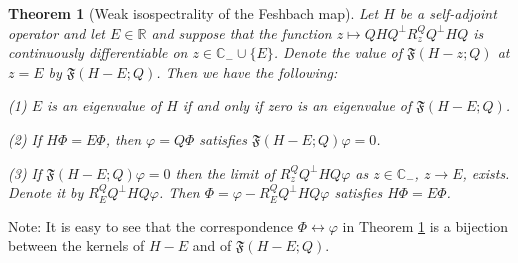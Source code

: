 \documentclass[letterpaper,onecolumn,11pt,accepted=2021-12-09]{quantumarticle}
\numberwithin{equation}{section}
\newcounter{resultcounter}[section]
\newtheorem{thm}[resultcounter]{Theorem}
\begin{document}
\begin{thm}[Weak isospectrality of the Feshbach map]
	\label{weakFeshthm}
Let $H$ be a self-adjoint operator and let $E\in\mathbb R$ and suppose that the function $z\mapsto QHQ^\perp R_z^Q Q^\perp HQ$ is continuously differentiable on $z\in{\mathbb C}_-\cup\{E\}$. Denote the value of ${\mathfrak F}(H-z;Q)$ at $z=E$ by ${\mathfrak F}(H-E;Q)$. Then we have the following:
\smallskip

(1) $E$ is an eigenvalue of $H$ if and only if zero is an eigenvalue of ${\mathfrak F}(H-E;Q)$. 
\smallskip

(2) If  $H\Phi=E\Phi$, then $\varphi=Q\Phi$ satisfies ${\mathfrak F}(H-E;Q)\varphi=0$.  
\smallskip

(3) If ${\mathfrak F}(H-E;Q)\varphi=0$ then the limit of $R_z^QQ^\perp HQ\varphi$ as $z \in{\mathbb C}_-$, $z\rightarrow E$, exists. Denote it by $R_E^QQ^\perp HQ\varphi$. Then $\Phi=\varphi -R^Q_{E}Q^\perp HQ\varphi$ satisfies $H\Phi=E\Phi$.
\end{thm}

Note: It is easy to see that the correspondence $\Phi\leftrightarrow\varphi$ in Theorem \ref{weakFeshthm} is a bijection between the kernels of $H-E$ and of ${\mathfrak F}(H-E;Q)$. 
\medskip
\end{document}
